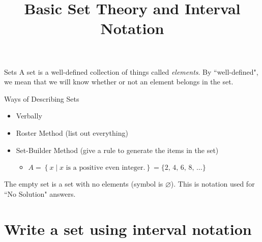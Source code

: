 \documentclass[t,usenames,dvipsnames]{beamer}
\title{Basic Set Theory and Interval Notation}
\author{}
\date{}
\begin{document}
\begin{frame}
    \titlepage
\end{frame}

\section{}

\begin{frame}{Sets}
A \alert{set} is a well-defined collection of things called \emph{elements}. By ``well-defined", we mean that we will know whether or not an element belongs in the set.
\end{frame}

\begin{frame}{Ways of Describing Sets}
	\begin{itemize}	
		\item Verbally  \newline\\  \pause
		\item Roster Method (list out everything)	\newline\\  \pause
		\item Set-Builder Method (give a rule to generate the items in the set)   \newline\\  \pause
		\begin{itemize}
		    \item $A = \left\lbrace  x \mid x \text{ is a positive even integer.} \right\rbrace = \{2, \, 4, \, 6, \, 8, \, \dots\}$
		\end{itemize}
	\end{itemize}   \vspace{11pt}  \pause
	
The \alert{empty set} is a set with no elements (symbol is $\varnothing$). This is notation used for ``No Solution" answers.
\end{frame}

\section{Write a set using interval notation}
\end{document}
